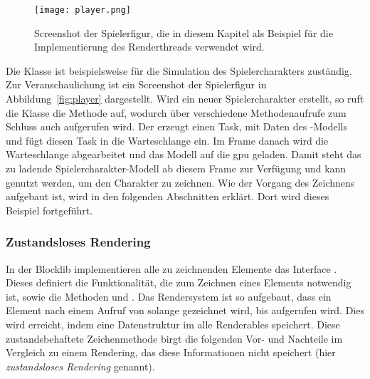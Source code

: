\begin{figure}
	\centering
	\texttt{[image: player.png]}
	\caption[Screenshot der Spielerfigur in der Blocklib.]{Screenshot der Spielerfigur, die in diesem Kapitel als Beispiel für die Implementierung des Renderthreads verwendet wird.}\label{fig:player}
\end{figure}

Die Klasse  ist beispielsweise für die Simulation des Spielercharakters zuständig. Zur Veranschaulichung ist ein Screenshot der Spielerfigur in Abbildung~\vref{fig:player} dargestellt. Wird ein neuer Spielercharakter erstellt, so ruft die Klasse  die Methode  auf, wodurch über verschiedene Methodenaufrufe zum Schluss auch  aufgerufen wird. Der  erzeugt einen Task, mit Daten des -Modells und fügt diesen Task in die Warteschlange ein. Im Frame danach wird die Warteschlange abgearbeitet und das Modell auf die \ac{gpu} geladen. Damit steht das zu ladende Spielercharakter-Modell ab diesem Frame zur Verfügung und kann genutzt werden, um den Charakter zu zeichnen. Wie der Vorgang des Zeichnens aufgebaut ist, wird in den folgenden Abschnitten erklärt. Dort wird dieses Beispiel fortgeführt.

\subsubsection{Zustandsloses Rendering}\label{sec:statelessRendering}
In der Blocklib implementieren alle zu zeichnenden Elemente das Interface . Dieses definiert die Funktionalität, die zum Zeichnen eines Elements notwendig ist, sowie die Methoden  und . Das Rendersystem ist so aufgebaut, dass ein Element nach einem Aufruf von  solange gezeichnet wird, bis  aufgerufen wird. Dies wird erreicht, indem eine Datenstruktur im  alle Renderables speichert. Diese zustandsbehaftete Zeichenmethode birgt die folgenden Vor- und Nachteile im Vergleich zu einem Rendering, das diese Informationen nicht speichert (hier \emph{zustandsloses Rendering} genannt).

